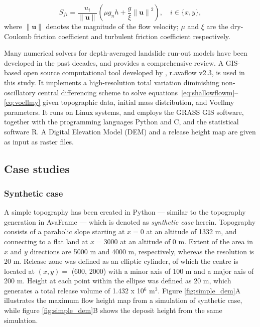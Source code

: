 \documentclass[utf8]{FrontiersinHarvard}
\begin{document}
\begin{equation} \label{eq:voellmy}
S_{fi} = \frac{u_{i}}{\left \| \mathbf{u} \right\|} (\mu g_{n}h + \frac{g}{\xi}{ \left \| \mathbf{u} \right\|}^2 ),\quad i \in \{x,y\},
\end{equation}
where $\|\mathbf{u}\|$ denotes the magnitude of the flow velocity; $\mu$ and $\xi$ are the dry-Coulomb friction coefficient and turbulent friction coefficient respectively.

Many numerical solvers for depth-averaged landslide run-out models have been developed in the past decades, and \citet{McDougall2017} provides a comprehensive review. A GIS-based open source computational tool developed by \citet{Mergili2017}, r.avaflow v2.3,  is used in this study. It implements a high-resolution total variation diminishing non-oscillatory central differencing scheme to solve equations~\ref{eq:shallowflowm}--\ref{eq:voellmy} given topographic data, initial mass distribution, and Voellmy parameters. It runs on Linux systems, and employs the GRASS GIS software, together with the programming languages Python and C, and the statistical software R. A Digital Elevation Model (DEM) and a release height map are given as input as raster files.

\subsection{Case studies}
\subsubsection{Synthetic case}
A simple topography has been created in Python --- similar to the topography generation in AvaFrame \citep{avaframe} --- which is denoted as \textit{synthetic case} herein. Topography consists of a parabolic slope starting at $x=0$ at an altitude of 1332 m, and connecting to a flat land at $x=3000$ at an altitude of 0 m. Extent of the area in $x$ and $y$ directions are 5000 m and 4000 m, respectively, whereas the resolution is 20 m. Release zone was defined as an elliptic cylinder, of which the centre is located at $ \left ( x,y \right ) = $ (600, 2000) with a minor axis of 100 m and a major axis of 200 m. Height at each point within the ellipse was defined as 20 m, which generates a total release volume of 1.432 x 10$^6$ m$^3$. Figure \ref{fig:simple_dem}A illustrates the maximum flow height map from a simulation of synthetic case, while figure \ref{fig:simple_dem}B shows the deposit height from the same simulation.
\end{document}
